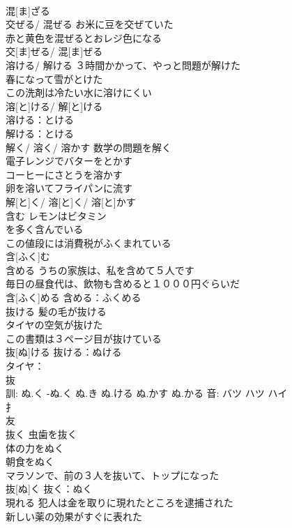 \documentclass[8pt]{extreport}
\begin{document}
\begin{CJK}{UTF8}{min}
\\	混[ま]ざる						
\\	交ぜる/ 混ぜる	お米に豆を交ぜていた 
\\	赤と黄色を混ぜるとおレジ色になる 
\\	交[ま]ぜる/ 混[ま]ぜる						
\\	溶ける/ 解ける	３時間かかって、やっと問題が解けた 
\\	春になって雪がとけた 
\\	この洗剤は冷たい水に溶けにくい 
\\	溶[と]ける/ 解[と]ける			
\\	溶ける：とける
\\	解ける：とける
\\	解く/ 溶く/ 溶かす	数学の問題を解く 
\\	電子レンジでバターをとかす 
\\	コーヒーにさとうを溶かす 
\\	卵を溶いてフライパンに流す 
\\	解[と]く/ 溶[と]く/ 溶[と]かす						
\\	含む	レモンはビタミン
\\	を多く含んでいる 
\\	この値段には消費税がふくまれている 
\\	含[ふく]む						
\\	含める	うちの家族は、私を含めて５人です 
\\	毎日の昼食代は、飲物も含めると１０００円ぐらいだ 
\\	含[ふく]める					含める：ふくめる
\\	抜ける	髪の毛が抜ける 
\\	タイヤの空気が抜けた 
\\	この書類は３ページ目が抜けている 
\\	抜[ぬ]ける			抜ける：ぬける
\\	タイヤ：
\\	抜 
\\	訓: ぬ.く -ぬ.く ぬ.き ぬ.ける ぬ.かす ぬ.かる 音: バツ ハツ ハイ 
\\	扌 
\\	友 
\\	抜く	虫歯を抜く 
\\	体の力をぬく 
\\	朝食をぬく 
\\	マラソンで、前の３人を抜いて、トップになった 
\\	抜[ぬ]く			抜く：ぬく
\\	現れる	犯人は金を取りに現れたところを逮捕された 
\\	新しい薬の効果がすぐに表れた 

\end{CJK}
\end{document}
